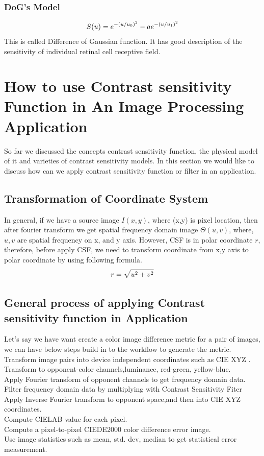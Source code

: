 \documentclass{article}
\begin{document}
\subsubsection{DoG's Model}
\begin{equation}
    \centering
    \label{eq:DoG}
     S(u) = e^{-(u/u_0)^2}-ae^{-(u/u_1)^2}
\end{equation}
This is called Difference of Gaussian function. It has good description of the sensitivity of individual retinal cell receptive field. 
\section{How to use Contrast sensitivity Function in An Image Processing Application}
So far we discussed the concepts contrast sensitivity function, the physical model of it and varieties of contrast sensitivity models. In this section we would like to discuss how can we apply contrast sensitivity function or filter in an application.

\subsection{Transformation of Coordinate System}
In general, if we have a source image $I(x,y)$, where (x,y) is pixel location, then after fourier transform we get spatial frequency domain image $\Theta(u,v)$, where, $u,v$ are spatial frequency on x, and y axis. However, CSF is in polar coordinate $r$, therefore, before apply CSF, we need to transform coordinate from x,y axis to polar coordinate by using following formula.
\begin{equation}
    \centering
    \label{eq:coor}
     r = \sqrt{u^2+v^2}
\end{equation}

\subsection{General process of applying Contrast sensitivity function in Application}
Let's say we have want create a color image difference metric for a pair of images, we can have below steps build in to the workflow to generate the metric.\\

\textbullet Transform image pairs into device independent
coordinates such as CIE XYZ .\\
    \textbullet Transform to opponent-color channels,luminance, red-green, yellow-blue.\\
    \textbullet Apply Fourier transform of opponent channels to get frequency domain data.\\
    \textbullet Filter frequency domain data by multiplying with Contrast Sensitivity Fiter\\
    \textbullet Apply Inverse Fourier transform to opponent space,and then into CIE XYZ coordinates.\\
    \textbullet Compute CIELAB value for each pixel.\\
    \textbullet Compute a pixel-to-pixel CIEDE2000 color difference error image.\\
    \textbullet Use image statistics such as mean, std. dev, median to get statistical error measurement.
\end{document}
